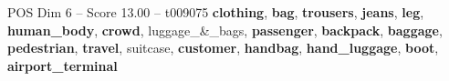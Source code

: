 \begin{textsample}{POS Dim 6 – Score 13.00 – t009075}  \label{ex:f6_pos_017}
\textbf{clothing}, \textbf{bag}, \textbf{trousers}, \textbf{jeans}, \textbf{leg}, \textbf{human\_body}, \textbf{crowd}, luggage\_\&\_bags, \textbf{passenger}, \textbf{backpack}, \textbf{baggage}, \textbf{pedestrian}, \textbf{travel}, suitcase, \textbf{customer}, \textbf{handbag}, \textbf{hand\_luggage}, \textbf{boot}, \textbf{airport\_terminal}

\end{textsample}
